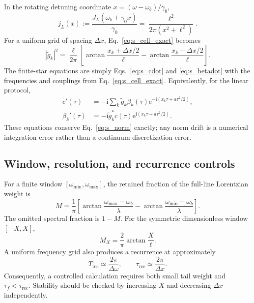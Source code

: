 \documentclass[reprint,superscriptaddress,floatfix,amsmath,amssymb,prresearch,aps]{revtex4-2}
\newcommand{\ee}{\mathrm{e}}
\newcommand{\ii}{\mathrm{i}}
\begin{document}
In the rotating detuning coordinate
\(x=(\omega-\omega_b)/\gamma_0\),
\begin{equation}
j_L(x):=\frac{J_L(\omega_b+\gamma_0x)}{\gamma_0}
=\frac{\ell^2}{2\pi(x^2+\ell^2)}.
\label{eq:s_j_dimensionless}
\end{equation}
For a uniform grid of spacing \(\Delta x\), Eq.~\eqref{eq:s_cell_exact}
becomes
\begin{equation}
|\widetilde g_k|^2=\frac{\ell}{2\pi}
\left[
\arctan\!\frac{x_k+\Delta x/2}{\ell}
-\arctan\!\frac{x_k-\Delta x/2}{\ell}
\right].
\label{eq:s_cell_dimensionless}
\end{equation}
The finite-star equations are simply Eqs.~\eqref{eq:s_cdot} and
\eqref{eq:s_betadot} with the frequencies and couplings from
Eq.~\eqref{eq:s_cell_exact}. Equivalently, for the linear protocol,
\begin{align}
c'(\tau)&=-\ii\sum_k\widetilde g_k\beta_k(\tau)
\ee^{-\ii(x_k\tau+a\tau^2/2)},
\nonumber\\
\beta_k'(\tau)&=-\ii\widetilde g_k^*c(\tau)
\ee^{\ii(x_k\tau+a\tau^2/2)}.
\label{eq:s_star_odes}
\end{align}
These equations conserve Eq.~\eqref{eq:s_norm} exactly; any norm drift is a
numerical integration error rather than a continuum-discretization error.

\subsection{Window, resolution, and recurrence controls}

For a finite window \([\omega_{\min},\omega_{\max}]\), the retained fraction
of the full-line Lorentzian weight is
\begin{equation}
M=\frac{1}{\pi}\left[
\arctan\!\frac{\omega_{\max}-\omega_b}{\lambda}
-\arctan\!\frac{\omega_{\min}-\omega_b}{\lambda}
\right].
\label{eq:s_window_mass}
\end{equation}
The omitted spectral fraction is \(1-M\). For the symmetric dimensionless
window \([-X,X]\),
\begin{equation}
M_X=\frac{2}{\pi}\arctan\frac{X}{\ell}.
\label{eq:s_symmetric_mass}
\end{equation}
A uniform frequency grid also produces a recurrence at approximately
\begin{equation}
T_{\mathrm{rec}}\simeq\frac{2\pi}{\Delta\omega},
\qquad
\tau_{\mathrm{rec}}\simeq\frac{2\pi}{\Delta x}.
\label{eq:s_recurrence}
\end{equation}
Consequently, a controlled calculation requires both small tail weight and
\(\tau_f<\tau_{\mathrm{rec}}\). Stability should be checked by increasing
\(X\) and decreasing \(\Delta x\) independently.
\end{document}
